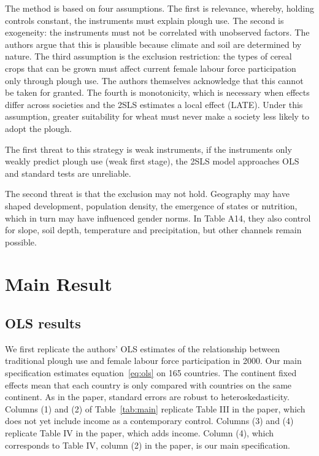 \documentclass[11pt,a4paper]{article}
\newif\ifshowinstr
\newcommand{\instr}[1]{\ifshowinstr{\leavevmode\color{gray}\itshape\small [#1]\par}\fi}
\begin{document}
The method is based on four assumptions. The first is relevance, whereby, holding controls constant, the instruments must explain plough use. The second is exogeneity: the instruments must not be correlated with unobserved factors. The authors argue that this is plausible because climate and soil are determined by nature. The third assumption is the exclusion restriction: the types of cereal crops that can be grown must affect current female labour force participation only through plough use. The authors themselves acknowledge that this cannot be taken for granted. The fourth is monotonicity, which is necessary when effects differ across societies and the 2SLS estimates a local effect (LATE). Under this assumption, greater suitability for wheat must never make a society less likely to adopt the plough.

The first threat to this strategy is weak instruments, if the instruments only weakly predict plough use (weak first stage), the 2SLS model approaches OLS and standard tests are unreliable.

The second threat is that the exclusion may not hold. Geography may have shaped development, population density, the emergence of states or nutrition, which in turn may have influenced gender norms. In Table A14, they also control for slope, soil depth, temperature and precipitation, but other channels remain possible.

\section{Main Result}

\subsection{OLS results}

\instr{This part should include your main replication table (Table~\ref{tab:main}) and figure(s) (at least Figure~\ref{fig:main}). Replicate at least what you consider the main column of the main results table, as well as one or two figures that visualize the result. Do your results differ? Worksheet~A.3 helps you think about why they might differ. It is fine if you cannot replicate a number exactly, as long as you understand why.}

We first replicate the authors' OLS estimates of the relationship between traditional plough use and female labour force participation in 2000. Our main specification estimates equation~\eqref{eq:ols} on 165 countries. The continent fixed effects mean that each country is only compared with countries on the same continent. As in the paper, standard errors are robust to heteroskedasticity. Columns (1) and (2) of Table~\ref{tab:main} replicate Table III in the paper, which does not yet include income as a contemporary control. Columns (3) and (4) replicate Table IV in the paper, which adds income. Column (4), which corresponds to Table IV, column (2) in the paper, is our main specification.
\end{document}

